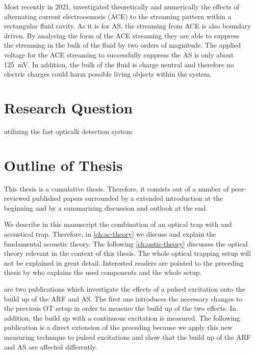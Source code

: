 Most recently in 2021,  investigated theoretically and 
numerically the effects of alternating current electroosmosis (ACE) to the 
streaming pattern within a rectangular fluid cavity. As it is for AS, the 
streaming from ACE is also boundary driven. By analysing the form of the ACE 
streaming they are able to suppress the streaming in the bulk of the fluid by 
two orders of magnitude. The applied voltage for the ACE streaming to 
successfully suppress the AS is only about \SI{125}{\milli\volt}. In addition, 
the bulk of the fluid is charge neutral and therefore no electric charges could 
harm possible living objects within the system.


\section{Research Question\label{sec:I-researchquestion}}

utilizing the fast opticalk detection system

\section{Outline of Thesis\label{sec:I-outline}}

This thesis is a cumulative thesis. Therefore, it consists out of a number of 
peer-reviewed published papers surrounded by a extended introduction at the 
beginning and by a summarizing discussion and outlook at the end.

We describe in this manuscript the combination of an optical trap with and 
acoustical trap. Therefore, in \cref{ch:ac-theory} we discuss and explain the 
fundamental acoustic theory. The following \cref{ch:optic-theory} discusses the 
optical theory relevant in the context of this thesis. The whole optical 
trapping setup will not be explained in great detail. Interested readers are 
pointed to the preceding thesis by  who explains the used 
components and the whole setup.

 are two publications which investigate the 
effects of a pulsed excitation onto the build up of the ARF and AS. The first 
one introduces the necessary changes to the previous OT setup in order to 
measure the build up of the two effects. In addition, the build up with a 
continuous excitation is measured. The following publication is a direct 
extension of the preceding because we apply this new measuring technique to 
pulsed excitations and show that the build up of the ARF and AS are affected 
differently.

